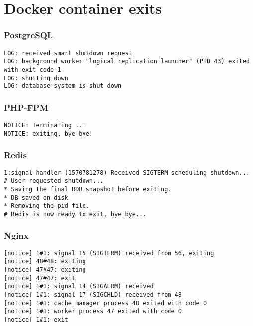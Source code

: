 \section{Docker container exits}

\label{DockerExits}

\subsubsection{PostgreSQL}
\begin{verbatim}
LOG: received smart shutdown request
LOG: background worker "logical replication launcher" (PID 43) exited with exit code 1
LOG: shutting down
LOG: database system is shut down
\end{verbatim}

\subsubsection{PHP-FPM}
\begin{verbatim}
NOTICE: Terminating ...
NOTICE: exiting, bye-bye!
\end{verbatim}

\subsubsection{Redis}
\begin{verbatim}
1:signal-handler (1570781278) Received SIGTERM scheduling shutdown...
# User requested shutdown...
* Saving the final RDB snapshot before exiting.
* DB saved on disk
* Removing the pid file.
# Redis is now ready to exit, bye bye...
\end{verbatim}

\subsubsection{Nginx}
\begin{verbatim}
[notice] 1#1: signal 15 (SIGTERM) received from 56, exiting
[notice] 48#48: exiting
[notice] 47#47: exiting
[notice] 47#47: exit
[notice] 1#1: signal 14 (SIGALRM) received
[notice] 1#1: signal 17 (SIGCHLD) received from 48
[notice] 1#1: cache manager process 48 exited with code 0
[notice] 1#1: worker process 47 exited with code 0
[notice] 1#1: exit
\end{verbatim}

